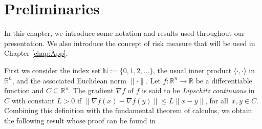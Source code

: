 \chapter{Preliminaries}  \label{chap:Prel}

In this chapter, we introduce  some notation and results used throughout our presentation. We also introduce the concept of risk measure that will be used in Chapter \ref{chap:App}.



First we  consider the  index set  ${\mathbb{N}}:=\{0,1,2,\ldots\}$,  the usual inner  product  $\langle \cdot,\cdot \rangle$ in $\mathbb{R}^n$, and the associated Euclidean norm    $\|\cdot\|$.
Let  $f:\mathbb{R}^n \to \mathbb{R}$ be a differentiable function and $C \subseteq \mathbb{R}^n$. The  gradient $\nabla f$ of $f$ is said to be {\it Lipschitz continuous} in $C$ with constant $L>0$ if $\|\nabla f(x)-\nabla f(y)\|\leq L \|x-y\|$, for all~$x, y\in C$. Combining this definition with the fundamental theorem of calculus, we obtain the following result whose proof can be found in \cite[Proposition A.24]{Bertsekas1999}.

